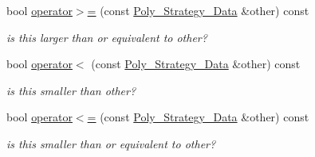 \begin{Indent}
\begin{DoxyCompactItemize}
\mbox{\label{group__strategygroup_a10eaa72d8dd9d02be47c7450d0358911}} 
bool \hyperlink{group__strategygroup_a10eaa72d8dd9d02be47c7450d0358911}{operator$>$=} (const \hyperlink{group__strategygroup_class_poly___strategy___data}{Poly\+\_\+\+Strategy\+\_\+\+Data} \&other) const
\begin{DoxyCompactList}\small\item\em is {\ttfamily this} larger than or equivalent to other? \end{DoxyCompactList}\item 
\mbox{\label{group__strategygroup_a77f188486ec685a0848eb8ff21d9c1cc}} 
bool \hyperlink{group__strategygroup_a77f188486ec685a0848eb8ff21d9c1cc}{operator$<$} (const \hyperlink{group__strategygroup_class_poly___strategy___data}{Poly\+\_\+\+Strategy\+\_\+\+Data} \&other) const
\begin{DoxyCompactList}\small\item\em is {\ttfamily this} smaller than other? \end{DoxyCompactList}\item 
\mbox{\label{group__strategygroup_a861774f75e0585613a250483728a7ed2}} 
bool \hyperlink{group__strategygroup_a861774f75e0585613a250483728a7ed2}{operator$<$=} (const \hyperlink{group__strategygroup_class_poly___strategy___data}{Poly\+\_\+\+Strategy\+\_\+\+Data} \&other) const
\begin{DoxyCompactList}\small\item\em is {\ttfamily this} smaller than or equivalent to other? \end{DoxyCompactList}\end{DoxyCompactItemize}
\end{Indent}
